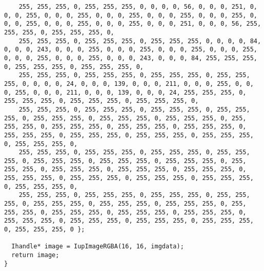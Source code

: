 \documentclass{ctexart}
\begin{document}
\begin{lstlisting}
    255, 255, 255, 0, 255, 255, 255, 0, 0, 0, 0, 56, 0, 0, 0, 251, 0, 0, 0, 255, 0, 0, 0, 255, 0, 0, 0, 255, 0, 0, 0, 255, 0, 0, 0, 255, 0, 0, 0, 255, 0, 0, 0, 255, 0, 0, 0, 255, 0, 0, 0, 251, 0, 0, 0, 56, 255, 255, 255, 0, 255, 255, 255, 0,
    255, 255, 255, 0, 255, 255, 255, 0, 255, 255, 255, 0, 0, 0, 0, 84, 0, 0, 0, 243, 0, 0, 0, 255, 0, 0, 0, 255, 0, 0, 0, 255, 0, 0, 0, 255, 0, 0, 0, 255, 0, 0, 0, 255, 0, 0, 0, 243, 0, 0, 0, 84, 255, 255, 255, 0, 255, 255, 255, 0, 255, 255, 255, 0,
    255, 255, 255, 0, 255, 255, 255, 0, 255, 255, 255, 0, 255, 255, 255, 0, 0, 0, 0, 24, 0, 0, 0, 139, 0, 0, 0, 211, 0, 0, 0, 255, 0, 0, 0, 255, 0, 0, 0, 211, 0, 0, 0, 139, 0, 0, 0, 24, 255, 255, 255, 0, 255, 255, 255, 0, 255, 255, 255, 0, 255, 255, 255, 0,
    255, 255, 255, 0, 255, 255, 255, 0, 255, 255, 255, 0, 255, 255, 255, 0, 255, 255, 255, 0, 255, 255, 255, 0, 255, 255, 255, 0, 255, 255, 255, 0, 255, 255, 255, 0, 255, 255, 255, 0, 255, 255, 255, 0, 255, 255, 255, 0, 255, 255, 255, 0, 255, 255, 255, 0, 255, 255, 255, 0, 255, 255, 255, 0,
    255, 255, 255, 0, 255, 255, 255, 0, 255, 255, 255, 0, 255, 255, 255, 0, 255, 255, 255, 0, 255, 255, 255, 0, 255, 255, 255, 0, 255, 255, 255, 0, 255, 255, 255, 0, 255, 255, 255, 0, 255, 255, 255, 0, 255, 255, 255, 0, 255, 255, 255, 0, 255, 255, 255, 0, 255, 255, 255, 0, 255, 255, 255, 0,
    255, 255, 255, 0, 255, 255, 255, 0, 255, 255, 255, 0, 255, 255, 255, 0, 255, 255, 255, 0, 255, 255, 255, 0, 255, 255, 255, 0, 255, 255, 255, 0, 255, 255, 255, 0, 255, 255, 255, 0, 255, 255, 255, 0, 255, 255, 255, 0, 255, 255, 255, 0, 255, 255, 255, 0, 255, 255, 255, 0, 255, 255, 255, 0 };

  Ihandle* image = IupImageRGBA(16, 16, imgdata);
  return image;
}


\end{lstlisting}
\end{document}
